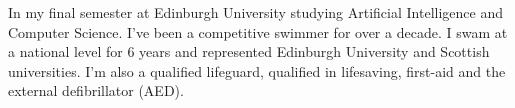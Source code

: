 

\begin{cvparagraph}

    In my final semester at Edinburgh University studying Artificial Intelligence and Computer Science. I've been a competitive swimmer for over a decade. I swam at a national level for 6 years and represented Edinburgh University and Scottish universities. I'm also a qualified lifeguard, qualified in lifesaving, first-aid and the external defibrillator (AED).

\end{cvparagraph}


